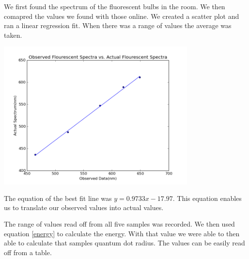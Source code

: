 \documentclass[12pt letterpaper]{article}
\begin{document}
We first found the spectrum of the fluorescent bulbs in the room. We then comapred the values we found with those online. We created a scatter plot and ran a linear regression fit. When there was a range of values the average was taken. 
\begin{center}
\includegraphics[width=0.75\textwidth]{spectra.png}
\end{center}

\noindent The equation of the best fit line was $y = 0.9733 x - 17.97$. This equation enables us to translate our observed values into actual values. 


The range of values read off from all five samples was recorded. We then used equation \ref{energy} to calculate the energy. With that value we were able to then able to calculate that samples quantum dot radius. The values can be easily read off from a table. 
\end{document}
